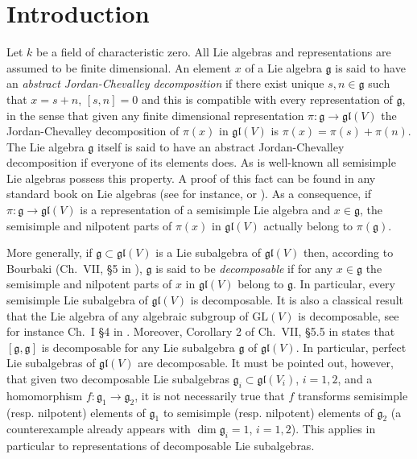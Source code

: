 \documentclass{amsart}
\theoremstyle{definition}
\theoremstyle{remark}
\numberwithin{equation}{section}
\newcommand \g{{\mathfrak g}}
\newcommand \gl{{\mathfrak {gl}}}
\begin{document}
\maketitle


\section{Introduction}
Let $k$ be a field of characteristic zero.
All Lie algebras and representations are assumed to be finite dimensional.
An element $x$ of a Lie algebra $\g$ is said to have an \emph{abstract Jordan-Chevalley decomposition}
if there exist unique $s,n\in\g$ such that $x=s+n$, $[s,n]=0$ and
this is compatible with every representation of $\g$, in the sense that
given any finite dimensional representation $\pi:\g\to\gl(V)$
the Jordan-Chevalley decomposition of $\pi(x)$ in $\gl(V)$ is $\pi(x)=\pi(s)+\pi(n)$.
The Lie algebra $\g$ itself is said to have an abstract Jordan-Chevalley decomposition
if everyone of its elements does. As is well-known all semisimple Lie algebras possess
this property. A proof of this fact can be found in any standard book on Lie algebras
(see for instance\cite{Bo1}, \cite{FH} or \cite{Hu}).
As a consequence, if $\pi:\g\to\gl(V)$ is a representation of a
semisimple Lie algebra and $x\in\g$,
the semisimple and nilpotent parts of $\pi(x)$ in $\gl(V)$
actually belong to $\pi(\g)$.

More generally, if $\g\subset\gl(V)$ is a Lie subalgebra of $\gl(V)$ then,
according to Bourbaki (Ch.\ VII, \S5 in \cite{Bo7}),
$\g$ is said to be \emph{decomposable} if for any $x\in\g$
the semisimple and nilpotent parts of $x$ in $\gl(V)$
belong to $\g$.
In particular, every semisimple Lie subalgebra of $\gl(V)$
is decomposable. It is also a classical result that
the Lie algebra of any algebraic subgroup of $\text{GL}(V)$
is decomposable, see for instance Ch.\ I \S4 in \cite{Bo}.
Moreover, Corollary 2 of Ch.\ VII, \S5.5 in \cite{Bo7} states that $[\g,\g]$ is
decomposable for any  Lie subalgebra $\g$ of $\gl(V)$.
In particular, perfect Lie  subalgebras of $\gl(V)$ are decomposable.
It must be pointed out, however, that given two
decomposable Lie subalgebras $\g_i\subset\gl(V_i)$, $i=1,2$, and a
homomorphism $f:\g_1\to\g_2$,
it is not necessarily true that $f$ transforms
semisimple (resp. nilpotent) elements of $\g_1$ to
semisimple (resp. nilpotent) elements of $\g_2$
(a counterexample already appears with $\dim\g_i=1$, $i=1,2$).
This applies in particular to representations of decomposable Lie subalgebras.
\end{document}
